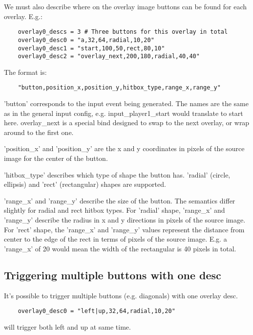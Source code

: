 \documentclass[a4paper, 11pt]{article}
\begin{document}
We must also describe where on the overlay image buttons can be found for each overlay.
E.g.:

\begin{verbatim}
    overlay0_descs = 3 # Three buttons for this overlay in total
    overlay0_desc0 = "a,32,64,radial,10,20"
    overlay0_desc1 = "start,100,50,rect,80,10"
    overlay0_desc2 = "overlay_next,200,180,radial,40,40"
\end{verbatim}

The format is:

\begin{verbatim}
    "button,position_x,position_y,hitbox_type,range_x,range_y"
\end{verbatim}

'button' corresponds to the input event being generated. The names are the same as in the general input config, e.g. input\_player1\_start would translate to start here. overlay\_next is a special bind designed to swap to the next overlay, or wrap around to the first one.

'position\_x' and 'position\_y' are the x and y coordinates in pixels of the source image for the center of the button.

'hitbox\_type' describes which type of shape the button has. 'radial' (circle, ellipsis) and 'rect' (rectangular) shapes are supported.

'range\_x' and 'range\_y' describe the size of the button. The semantics differ slightly for radial and rect hitbox types. For 'radial' shape, 'range\_x' and 'range\_y' describe the radius in x and y directions in pixels of the source image. For 'rect' shape, the 'range\_x' and 'range\_y' values represent the distance from center to the edge of the rect in terms of pixels of the source image. E.g. a 'range\_x' of 20 would mean the width of the rectangular is 40 pixels in total.

\subsection*{Triggering multiple buttons with one desc}

It's possible to trigger multiple buttons (e.g. diagonals) with one overlay desc.

\begin{verbatim}
    overlay0_desc0 = "left|up,32,64,radial,10,20"
\end{verbatim}

will trigger both left and up at same time.
\end{document}
